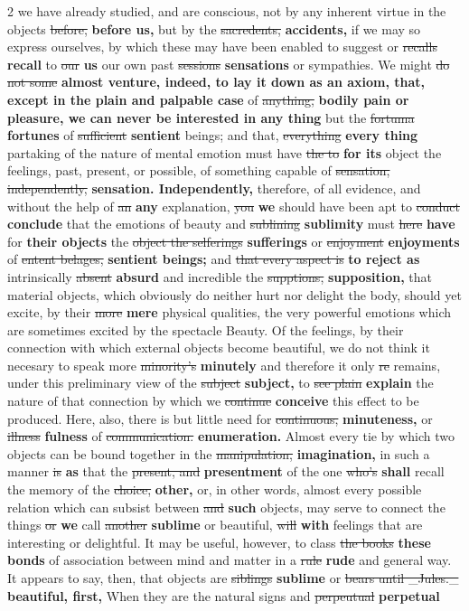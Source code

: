 \documentclass[10pt]{article}
\begin{document}
\begin{multicols}{2}
we have already studied, and are conscious, not by any inherent virtue in the objects \sout{before,} \textbf{before us,} but by the \sout{sacredents,} \textbf{accidents,} if we may so express ourselves, by which these may have been enabled to suggest or \sout{recalls} \textbf{recall} to \sout{our} \textbf{us} our own past \sout{sessions} \textbf{sensations} or sympathies. We might \sout{do not some} \textbf{almost venture, indeed, to lay it down as an axiom, that, except in the plain and palpable case} of \sout{anything,} \textbf{bodily pain or pleasure, we can never be interested in any thing} but the \sout{fortuma} \textbf{fortunes} of \sout{sufficient} \textbf{sentient} beings; and that, \sout{everything} \textbf{every thing} partaking of the nature of mental emotion must have \sout{the to} \textbf{for its} object the feelings, past, present, or possible, of something capable of \sout{sensation, independently,} \textbf{sensation. Independently,} therefore, of all evidence, and without the help of \sout{an} \textbf{any} explanation, \sout{you} \textbf{we} should have been apt to \sout{conduct} \textbf{conclude} that the emotions of beauty and \sout{sublining} \textbf{sublimity} must \sout{here} \textbf{have} for \textbf{their objects} the \sout{object the selferings} \textbf{sufferings} or \sout{enjoyment} \textbf{enjoyments} of \sout{entent belages,} \textbf{sentient beings;} and \sout{that every aspect is} \textbf{to reject as} intrinsically \sout{absent} \textbf{absurd} and incredible the \sout{supptions,} \textbf{supposition,} that material objects, which obviously do neither hurt nor delight the body, should yet excite, by their \sout{more} \textbf{mere} physical qualities, the very powerful emotions which are sometimes excited by the spectacle Beauty. Of the feelings, by their connection with which external objects become beautiful, we do not think it necesary to speak more \sout{minority’s} \textbf{minutely} and therefore it only \sout{re} remains, under this preliminary view of the \sout{subject} \textbf{subject,} to \sout{see plain} \textbf{explain} the nature of that connection by which we \sout{continue} \textbf{conceive} this effect to be produced. Here, also, there is but little need for \sout{continuous,} \textbf{minuteness,} or \sout{illness} \textbf{fulness} of \sout{communication.} \textbf{enumeration.} Almost every tie by which two objects can be bound together in the \sout{manipulation,} \textbf{imagination,} in such a manner \sout{is} \textbf{as} that the \sout{present, and} \textbf{presentment} of the one \sout{who's} \textbf{shall} recall the memory of the \sout{choice,} \textbf{other,} or, in other words, almost every possible relation which can subsist between \sout{and} \textbf{such} objects, may serve to connect the things \sout{or} \textbf{we} call \sout{another} \textbf{sublime} or beautiful, \sout{will} \textbf{with} feelings that are interesting or delightful. It may be useful, however, to class \sout{the books} \textbf{these bonds} of association between mind and matter in a \sout{rule} \textbf{rude} and general way. It appears to say, then, that objects are \sout{siblings} \textbf{sublime} or \sout{bears until \_Jules.\_} \textbf{beautiful, first,} When they are the natural signs and \sout{perpeutual} \textbf{perpetual} 
\end{multicols}
\end{document}

